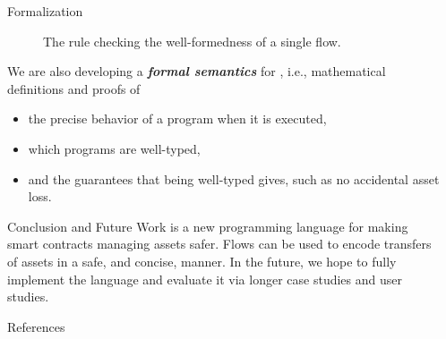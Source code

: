\documentclass[usenames, dvipsnames, final]{beamer}
\newlength{\sepwidth}
\newlength{\colwidth}
\newcommand{\separatorcolumn}{\begin{column}{\sepwidth}\end{column}}
\newcommand{\term}[1]{\textbf{\emph{#1}}}
\begin{document}
\begin{frame}[t]
\begin{columns}[t]
\begin{column}{\colwidth}
    \begin{block}{Formalization}
        \begin{figure}
            \centering
            \begin{mathpar}
            \end{mathpar}
            \caption{The rule checking the well-formedness of a single flow.}
            \label{fig:ok-flow-rule}
        \end{figure}

        We are also developing a \term{formal semantics} for \langName, i.e., mathematical definitions and proofs of
        \begin{itemize}
            \item the precise behavior of a program when it is executed,
            \item which programs are well-typed,
            \item and the guarantees that being well-typed gives, such as no accidental asset loss.
        \end{itemize}
  \end{block}

  \begin{block}{Conclusion and Future Work}
      \langName is a new programming language for making smart contracts managing assets safer.
      Flows can be used to encode transfers of assets in a safe, and concise, manner.
      In the future, we hope to fully implement the \langName language and evaluate it via longer case studies and user studies.
  \end{block}

  \begin{block}{References}
    \nocite{*}
    \scriptsize{}
  \end{block}

\end{column}

\separatorcolumn
\end{columns}
\end{frame}
\end{document}
